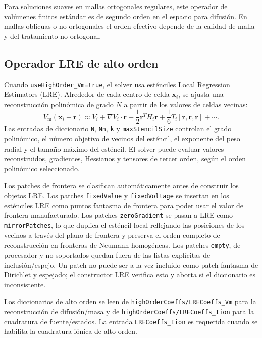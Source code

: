 \documentclass[11pt,a4paper]{article}
\newcommand{\code}[1]{\texttt{\small #1}}
\newcommand{\Vm}{V_{\text{m}}}
\newcommand{\grad}{\nabla}
\begin{document}
Para soluciones suaves en mallas ortogonales regulares, este operador de volúmenes finitos
estándar es de segundo orden en el espacio para difusión. En mallas oblicuas o no
ortogonales el orden efectivo depende de la calidad de malla y del tratamiento no ortogonal.

\subsection{Operador LRE de alto orden}
\label{sec:lre}

Cuando \code{useHighOrder\_Vm=true}, el solver usa esténciles Local Regression Estimators
(LRE). Alrededor de cada centro de celda $\mathbf{x}_i$, se ajusta una reconstrucción
polinómica de grado $N$ a partir de los valores de celdas vecinas:
\begin{equation}
  \Vm(\mathbf{x}_i+\mathbf{r})
  \approx
  V_i
  + \grad V_i\cdot\mathbf{r}
  + \frac{1}{2}\mathbf{r}^{T}H_i\mathbf{r}
  + \frac{1}{6}T_i[\mathbf{r},\mathbf{r},\mathbf{r}]
  + \cdots.
  \label{eq:lre-taylor}
\end{equation}
Las entradas de diccionario \code{N}, \code{Nn}, \code{k} y \code{maxStencilSize} controlan
el grado polinómico, el número objetivo de vecinos del esténcil, el exponente del peso
radial y el tamaño máximo del esténcil. El solver puede evaluar valores reconstruidos,
gradientes, Hessianos y tensores de tercer orden, según el orden polinómico seleccionado.

Los patches de frontera se clasifican automáticamente antes de construir los objetos LRE.
Los patches \code{fixedValue} y \code{fixedVoltage} se insertan en los esténciles LRE como
puntos fantasma de frontera para poder usar el valor de frontera manufacturado. Los patches
\code{zeroGradient} se pasan a LRE como \code{mirrorPatches}, lo que duplica el esténcil
local reflejando las posiciones de los vecinos a través del plano de frontera y preserva el
orden completo de reconstrucción en fronteras de Neumann homogéneas. Los patches
\code{empty}, de procesador y no soportados quedan fuera de las listas explícitas de
inclusión/espejo. Un patch no puede ser a la vez incluido como patch fantasma de Dirichlet
y espejado; el constructor LRE verifica esto y aborta si el diccionario es inconsistente.

Los diccionarios de alto orden se leen de \code{highOrderCoeffs/LRECoeffs\_Vm} para la
reconstrucción de difusión/masa y de \code{highOrderCoeffs/LRECoeffs\_Iion} para la
cuadratura de fuente/estados. La entrada \code{LRECoeffs\_Iion} es requerida cuando se
habilita la cuadratura iónica de alto orden.
\end{document}
